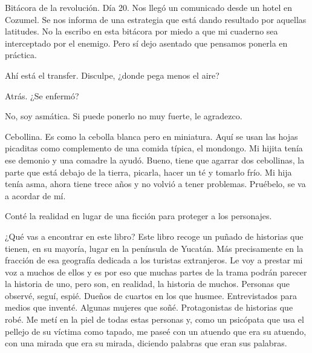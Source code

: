 \documentclass[11pt,twoside,openright,a6paper]{book}
\begin{document}
Bitácora de la revolución. Día 20. Nos llegó un comunicado desde un
hotel en Cozumel. Se nos informa de una estrategia que está dando resultado
por aquellas latitudes. No la escribo en esta bitácora por miedo a que
mi cuaderno sea interceptado por el enemigo. Pero sí dejo asentado que
pensamos ponerla en práctica.


\vspace{0.5cm}
\hrulefill\hspace{0.2cm} \decofourleft\decofourright \hspace{0.2cm} \hrulefill
\vspace{0.5cm}

Ahí está el transfer. Disculpe, ¿donde pega menos el aire?

Atrás. ¿Se enfermó?

No, soy asmática. Si puede ponerlo no muy fuerte, le agradezco.

Cebollina. Es como la cebolla blanca pero en miniatura. Aquí se usan las
hojas picaditas como complemento de una comida típica, el mondongo. Mi
hijita tenía ese demonio y una comadre la ayudó. Bueno, tiene que agarrar
dos cebollinas, la parte que está debajo de la tierra, picarla, hacer
un té y tomarlo frío. Mi hija tenía asma, ahora tiene trece años y no
volvió a tener problemas. Pruébelo, se va a acordar de mí.


\vspace{0.5cm}
\hrulefill\hspace{0.2cm} \decofourleft\decofourright \hspace{0.2cm} \hrulefill
\vspace{0.5cm}

Conté la realidad en lugar de una ficción para proteger a los personajes.


\vspace{0.5cm}
\hrulefill\hspace{0.2cm} \decofourleft\decofourright \hspace{0.2cm} \hrulefill
\vspace{0.5cm}

¿Qué vas a encontrar en este libro? Este libro recoge un puñado
de historias que tienen, en su mayoría, lugar en la península de
Yucatán. Más precisamente en la fracción de esa geografía dedicada a
los turistas extranjeros. Le voy a prestar mi voz a muchos de ellos y es
por eso que muchas partes de la trama podrán parecer la historia de uno,
pero son, en realidad, la historia de muchos. Personas que observé, seguí,
espié. Dueños de cuartos en los que husmee. Entrevistados para medios
que inventé. Algunas mujeres que soñé. Protagonistas de historias que
robé. Me metí en la piel de todas estas personas y, como un psicópata
que usa el pellejo de su víctima como tapado, me paseé con un atuendo
que era su atuendo, con una mirada que era su mirada, diciendo palabras
que eran sus palabras.
\end{document}
